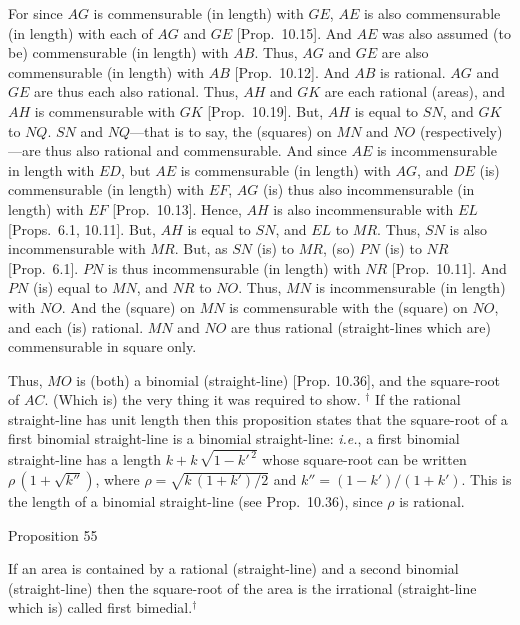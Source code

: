 For since $AG$ is commensurable (in length) with $GE$, $AE$ is also commensurable (in length)
with each of $AG$ and $GE$ [Prop.~10.15]. 
And $AE$ was also assumed (to be) commensurable (in length) with $AB$.  Thus,
$AG$ and $GE$ are also commensurable (in length) with $AB$
[Prop.~10.12]. And $AB$ is rational. $AG$
and $GE$ are thus each also  rational. Thus, $AH$ and $GK$ are each
rational (areas), and $AH$ is commensurable with $GK$ [Prop.~10.19]. But, $AH$ is equal to $SN$,
and $GK$ to $NQ$. $SN$ and $NQ$---that is to say, the (squares)
on $MN$ and $NO$ (respectively)---are thus also rational and commensurable. And since $AE$ is incommensurable in length with $ED$,
but $AE$ is commensurable (in length) with $AG$, and $DE$ (is) commensurable (in length)
with $EF$, $AG$ (is) thus also incommensurable (in length) with $EF$
[Prop.~10.13]. Hence, $AH$ is also incommensurable with $EL$ [Props.~6.1, 10.11]. But, $AH$ is equal to $SN$, and $EL$
to $MR$. Thus, $SN$ is also incommensurable with $MR$. But, as
$SN$ (is) to $MR$, (so) $PN$ (is) to $NR$ [Prop.~6.1].  $PN$ is thus incommensurable (in length) with $NR$ [Prop.~10.11]. And $PN$ (is) equal to $MN$, and $NR$ to
$NO$. Thus, $MN$ is incommensurable (in length) with $NO$. And the (square)
on $MN$ is commensurable with the (square) on $NO$, and each (is)
rational.  $MN$ and $NO$ are thus rational (straight-lines which are)
commensurable in square only.

Thus, $MO$ is (both) a binomial (straight-line) [Prop. 10.36], and the square-root of $AC$.
(Which is) the very thing it was required to show.
{\footnotesize\noindent $^\dag$ If the rational straight-line has unit length then this proposition states that the square-root of 
a first binomial straight-line is a binomial straight-line: {\em i.e.}, 
a first binomial straight-line has a length $k+k\,\sqrt{1-k'^{\,2}}$ whose
square-root can be written $\rho\,(1+\sqrt{k''})$, where $\rho=\sqrt{k\,(1+k')/2}$ and $k''=(1-k')/(1+k')$. This is the length of a binomial straight-line (see Prop.~10.36), since $\rho$ is rational.}


\begin{center}
{\large Proposition 55}
\end{center}

If an area is contained by a rational (straight-line)
and a second binomial (straight-line) then the square-root of the area
is the irrational (straight-line which is) called first bimedial.$^\dag$


